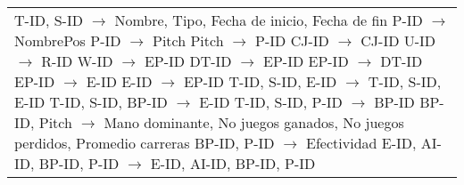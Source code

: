 \documentclass{report}
\begin{document}
\begin{tabularx}{\textwidth}{|X|}
                \hspace*{0.9cm} T-ID,  S-ID $\rightarrow$ Nombre,  Tipo,  Fecha de inicio,  Fecha de fin \newline
                \hspace*{0.9cm} P-ID $\rightarrow$ NombrePos \newline
                \hspace*{0.9cm} P-ID $\rightarrow$ Pitch \newline
                \hspace*{0.9cm} Pitch $\rightarrow$ P-ID \newline
                \hspace*{0.9cm} CJ-ID $\rightarrow$ CJ-ID \newline
                \hspace*{0.9cm} U-ID $\rightarrow$ R-ID \newline
                \hspace*{0.9cm} W-ID $\rightarrow$ EP-ID \newline
                \hspace*{0.9cm} DT-ID $\rightarrow$ EP-ID \newline
                \hspace*{0.9cm} EP-ID $\rightarrow$ DT-ID \newline
                \hspace*{0.9cm} EP-ID $\rightarrow$ E-ID \newline
                \hspace*{0.9cm} E-ID $\rightarrow$ EP-ID \newline
                \hspace*{0.9cm} T-ID,  S-ID,  E-ID $\rightarrow$ T-ID,  S-ID,  E-ID \newline
                \hspace*{0.9cm} T-ID,  S-ID,  BP-ID $\rightarrow$ E-ID \newline
                \hspace*{0.9cm} T-ID,  S-ID,  P-ID $\rightarrow$ BP-ID \newline
                \hspace*{0.9cm} BP-ID,  Pitch $\rightarrow$ Mano dominante,  No juegos ganados,  No juegos perdidos,  Promedio carreras \newline
                \hspace*{0.9cm} BP-ID,  P-ID $\rightarrow$ Efectividad \newline
                \hspace*{0.9cm} E-ID,  AI-ID,  BP-ID,  P-ID $\rightarrow$ E-ID,  AI-ID,  BP-ID,  P-ID \newline

\end{tabularx}
\end{document}
